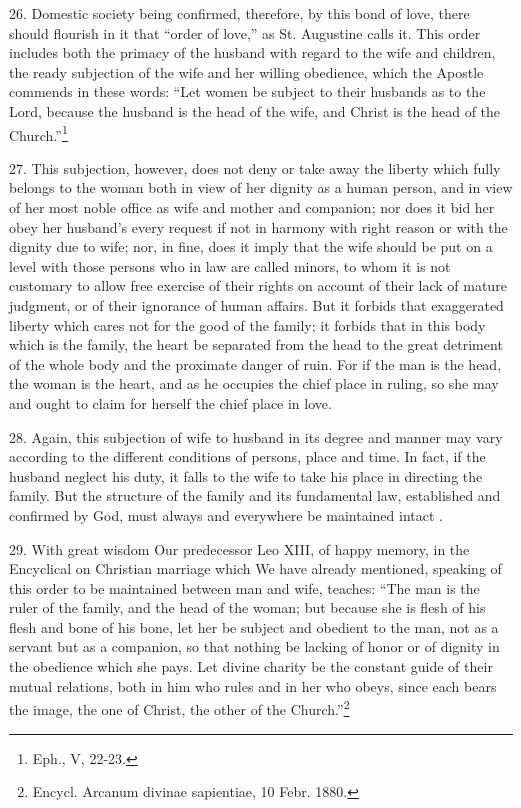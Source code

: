 \documentclass[12pt,a4paper]{book}
\begin{document}
26. Domestic society being confirmed, therefore, by this bond of love, there should flourish in it that ``order of love,'' as St. Augustine calls it. This order includes both the primacy of the husband with regard to the wife and children, the ready subjection of the wife and her willing obedience, which the Apostle commends in these words: ``Let women be subject to their husbands as to the Lord, because the husband is the head of the wife, and Christ is the head of the Church.''\footnote{Eph., V, 22-23.}

27. This subjection, however, does not deny or take away the liberty which fully belongs to the woman both in view of her dignity as a human person, and in view of her most noble office as wife and mother and companion; nor does it bid her obey her husband's every request if not in harmony with right reason or with the dignity due to wife; nor, in fine, does it imply that the wife should be put on a level with those persons who in law are called minors, to whom it is not customary to allow free exercise of their rights on account of their lack of mature judgment, or of their ignorance of human affairs. But it forbids that exaggerated liberty which cares not for the good of the family; it forbids that in this body which is the family, the heart be separated from the head to the great detriment of the whole body and the proximate danger of ruin. For if the man is the head, the woman is the heart, and as he occupies the chief place in ruling, so she may and ought to claim for herself the chief place in love.

28. Again, this subjection of wife to husband in its degree and manner may vary according to the different conditions of persons, place and time. In fact, if the husband neglect his duty, it falls to the wife to take his place in directing the family. But the structure of the family and its fundamental law, established and confirmed by God, must always and everywhere be maintained intact .

29. With great wisdom Our predecessor Leo XIII, of happy memory, in the Encyclical on Christian marriage which We have already mentioned, speaking of this order to be maintained between man and wife, teaches: ``The man is the ruler of the family, and the head of the woman; but because she is flesh of his flesh and bone of his bone, let her be subject and obedient to the man, not as a servant but as a companion, so that nothing be lacking of honor or of dignity in the obedience which she pays. Let divine charity be the constant guide of their mutual relations, both in him who rules and in her who obeys, since each bears the image, the one of Christ, the other of the Church.''\footnote{Encycl. Arcanum divinae sapientiae, 10 Febr. 1880.}
\end{document}

